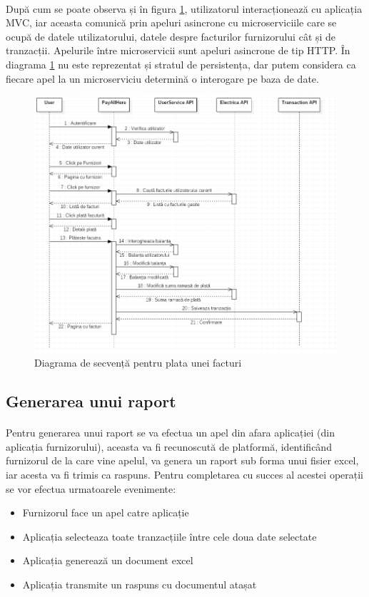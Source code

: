 \documentclass[12pt]{report}
\begin{document}
  	\paragraph{}După cum se poate observa și în figura \ref{utilizseq}, utilizatorul interacționează cu aplicația MVC, iar aceasta comunică prin apeluri asincrone cu microserviciile care se ocupă de datele utilizatorului, datele despre facturilor furnizorului cât și de tranzacții. Apelurile între microservicii sunt apeluri asincrone de tip HTTP. În diagrama \ref{utilizseq} nu este reprezentat și stratul de persistența, dar putem considera ca fiecare apel la un microserviciu determină o interogare pe baza de date.
  	\begin{figure}[h]
  	\centering
  	\includegraphics[scale=0.9]{utilizseq}
	\caption{Diagrama de secvență pentru plata unei facturi}  
	\label{utilizseq}
  	\end{figure}
  	\subsection{Generarea unui raport}
  	\paragraph{}Pentru generarea unui raport se va efectua un apel din afara aplicației (din aplicația furnizorului), aceasta va fi recunoscută de platformă, identificând furnizorul de la care vine apelul, va genera un raport sub forma unui fisier excel, iar acesta va fi trimis ca raspuns. Pentru completarea cu succes al acestei operații se vor efectua urmatoarele evenimente:
  	\begin{itemize}
  	\item Furnizorul face un apel catre aplicație
  	\item Aplicația selecteaza toate tranzacțiile între cele doua date selectate
  	\item Aplicația generează un document excel
  	\item Aplicația transmite un raspuns cu documentul atașat
  	\end{itemize}
\end{document}
